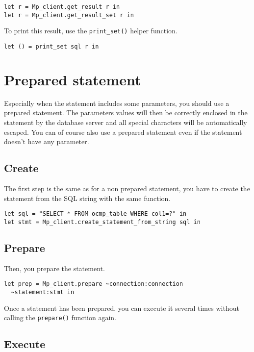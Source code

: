 \documentclass[a4paper, english, 11pt]{article}
\begin{document}
\begin{verbatim}
let r = Mp_client.get_result r in
let r = Mp_client.get_result_set r in
\end{verbatim}

To print this result, use the \texttt{print\_set()} helper function.

\begin{verbatim}
let () = print_set sql r in 
\end{verbatim}

\section{Prepared statement}

Especially when the statement includes some parameters, you should use a prepared statement. The parameters values will then be correctly enclosed in the statement by the database server and all special characters will be automatically escaped. You can of course also use a prepared statement even if the statement doesn't have any parameter.

\subsection{Create}

The first step is the same as for a non prepared statement, you have to create the statement from the SQL string with the same function.

\begin{verbatim}
let sql = "SELECT * FROM ocmp_table WHERE col1=?" in
let stmt = Mp_client.create_statement_from_string sql in
\end{verbatim}

\subsection{Prepare}

Then, you prepare the statement.

\begin{verbatim}
let prep = Mp_client.prepare ~connection:connection
  ~statement:stmt in
\end{verbatim}

Once a statement has been prepared, you can execute it several times without calling the \texttt{prepare()} function again. 

\subsection{Execute}
\end{document}
